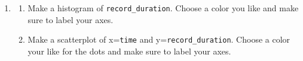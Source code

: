 \documentclass[12pt]{article}
\begin{document}
\begin{enumerate}[leftmargin=1.2em, label=\textbf{\arabic*.}]
\clearpage
  \item
  \begin{enumerate}
    \item Make a histogram of \texttt{record\_duration}. Choose a color you like and make sure to label your axes. \vspace{2.5cm}
    \item Make a scatterplot of x=\texttt{time} and y=\texttt{record\_duration}. Choose a color your like for the dots and make sure to label your axes. \vspace{3cm}
  \end{enumerate}


\end{enumerate}
\end{document}

